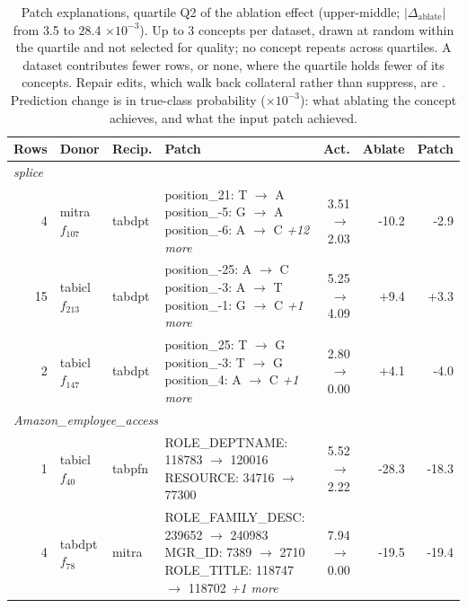 \begin{table}[t]
\centering
\caption{Patch explanations, quartile Q2 of the ablation effect (upper-middle; $|\Delta_{\mathrm{ablate}}|$ from 3.5 to 28.4 $\times 10^{-3}$). Up to 3 concepts per dataset, drawn at random within the quartile and not selected for quality; no concept repeats across quartiles. A dataset contributes fewer rows, or none, where the quartile holds fewer of its concepts. Repair edits, which walk back collateral rather than suppress, are . Prediction change is in true-class probability ($\times 10^{-3}$): what ablating the concept achieves, and what the input patch achieved.}
\label{tab:patch_q2}
\small
\setlength{\tabcolsep}{4pt}
\begin{tabularx}{\textwidth}{rllXrrr}
\toprule
Rows & Donor & Recip. & Patch & Act. & Ablate & Patch \\
\midrule
\multicolumn{7}{l}{\textit{splice}} \\
4 & mitra $f_{107}$ & tabdpt & \makecell[tl]{position\_21: T $\to$ A \\ position\_-5: G $\to$ A \\ position\_-6: A $\to$ C \\ \textit{+12 more}} & 3.51 $\to$ 2.03 & -10.2 & -2.9 \\
15 & tabicl $f_{213}$ & tabdpt & \makecell[tl]{position\_-25: A $\to$ C \\ position\_-3: A $\to$ T \\ position\_-1: G $\to$ C \\ \textit{+1 more}} & 5.25 $\to$ 4.09 & +9.4 & +3.3 \\
2 & tabicl $f_{147}$ & tabdpt & \makecell[tl]{position\_25: T $\to$ G \\ position\_-3: T $\to$ G \\ position\_4: A $\to$ C \\ \textit{+1 more}} & 2.80 $\to$ 0.00 & +4.1 & -4.0 \\
\midrule
\multicolumn{7}{l}{\textit{Amazon\_employee\_access}} \\
1 & tabicl $f_{40}$ & tabpfn & \makecell[tl]{ROLE\_DEPTNAME: 118783 $\to$ 120016 \\ RESOURCE: 34716 $\to$ 77300} & 5.52 $\to$ 2.22 & -28.3 & -18.3 \\
4 & tabdpt $f_{78}$ & mitra & \makecell[tl]{ROLE\_FAMILY\_DESC: 239652 $\to$ 240983 \\ MGR\_ID: 7389 $\to$ 2710 \\ ROLE\_TITLE: 118747 $\to$ 118702 \\ \textit{+1 more}} & 7.94 $\to$ 0.00 & -19.5 & -19.4 \\

\end{tabularx}
\end{table}
